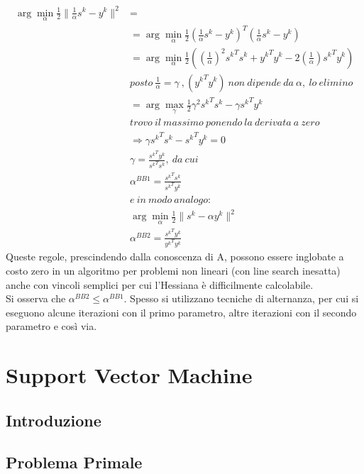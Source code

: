 \documentclass{report}
\begin{document}
\begin{equation} 
\label{BB6}
	\begin{split}
	\arg\min_{\alpha} \frac{1}{2} \|\frac{1}{\alpha} s^k - y^k\|^2& =\\
	 &= \arg\min_{\alpha} \frac{1}{2}\left (\frac{1}{\alpha} s^k - y^k\right)^T\left(\frac{1}{\alpha} s^k - y^k\right)\\
	 &= \arg\min_{\alpha} \frac{1}{2} \left(\left(\frac{1}{\alpha}\right)^2 {s^k}^T s^k + {y^k}^T y^k-2\left(\frac{1}{\alpha}\right){s^k}^T y^k\right)\\
	 & posto\  \frac{1}{\alpha} = \gamma \ ,({y^k}^T y^k)\ non\ dipende\ da\ \alpha,\ lo\ elimino\\
	 &=  \arg\max_{\gamma} \frac{1}{2} \gamma^2 {s^k}^T s^k -\gamma{s^k}^T y^k\\
	 &trovo\ il\ massimo\ ponendo\ la\ derivata\ a\ zero\\
	 &\Rightarrow \gamma {s^k}^T s^k -{s^k}^T y^k = 0\\
	 & \gamma = \frac{{s^k}^T y^k}{{s^k}^T s^k}, \ da\ cui\\
	 & \alpha^{BB1} = \frac{{s^k}^T s^k}{{s^k}^T y^k}\\
	 & e\ in\ modo\ analogo: \\
	 & \arg\min_{\alpha} \frac{1}{2} \|s^k - \alpha y^k\|^2 \\
	 & \alpha^{BB2} = \frac{{s^k}^T y^k}{{y^k}^T y^k}
	\end{split}
\end{equation}
Queste regole, prescindendo dalla conoscenza di A, possono essere inglobate a costo zero in un algoritmo per problemi non lineari (con line search inesatta) anche con vincoli semplici per cui l'Hessiana è difficilmente calcolabile.\\
Si osserva che $\alpha^{BB2} \leqslant \alpha^{BB1}$. Spesso si utilizzano tecniche di alternanza, per cui si eseguono alcune iterazioni con il primo parametro, altre iterazioni con il secondo parametro e così via.

\chapter{Support Vector Machine}

\section{Introduzione}



\section{Problema Primale}
\end{document}
